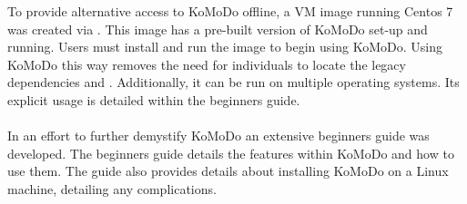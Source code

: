   To provide alternative access to KoMoDo offline, a VM image running Centos 7 was created via . This image has a pre-built version of KoMoDo set-up and running. Users must install  and run the image to begin using KoMoDo. Using KoMoDo this way removes the need for individuals to locate the legacy dependencies  and . Additionally, it can be run on multiple operating systems. Its explicit usage is detailed within the beginners guide.\\\\
  In an effort to further demystify KoMoDo an extensive beginners guide was developed. The beginners guide details the features within KoMoDo and how to use them. The guide also provides details about installing KoMoDo on a Linux machine, detailing any complications.

